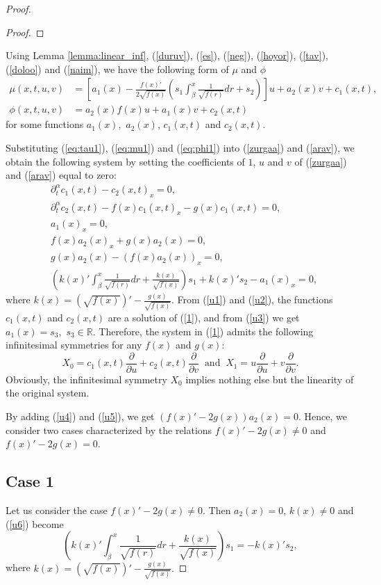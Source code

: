 \documentclass[12pt]{amsart}
\begin{document}
\begin{proof}
\begin{proof}
\end{proof}

Using Lemma \ref{lemma:linear_inf}, (\ref{duruv}), (\ref{es}), (\ref{neg}), (\ref{hoyor}), (\ref{tav}), (\ref{doloo}) and (\ref{naim}), we have the following form of $\mu$ and $\phi$
\begin{align}
\mu(x,t,u,v)&=\left[a_1(x)-\frac{f(x)'}{2\sqrt{f(x)}}\left( s_1\int^x_{\beta} \frac{1}{\sqrt{f(r)}}dr+s_2 \right)\right]u+a_2(x)v+c_1(x,t),\label{eq:mu1}\\
\phi(x,t,u,v)&=a_2(x)f(x)u+a_1(x)v+c_2(x,t)\label{eq:phi1}
\end{align}
for some functions $a_1(x),$ $a_2(x)$, $c_1(x,t)$ and $c_2(x,t)$.

Substituting (\ref{eq:tau1}), (\ref{eq:mu1}) and (\ref{eq:phi1}) into (\ref{zurgaa}) and  (\ref{arav}), we obtain the following system by setting the coefficients of $1$, $u$ and $v$ of (\ref{zurgaa}) and  (\ref{arav})  equal to zero:
\begin{align}
&\partial^\alpha_t c_1(x,t)-c_2(x,t)_x=0,\label{u1}\\
&\partial^\alpha_tc_2(x,t)-f(x)c_1(x,t)_x-g(x)c_1(x,t)=0,\label{u2}\\
&a_1(x)_x=0,\label{u3}\\
&f(x)a_2(x)_x+g(x)a_2(x)=0,\label{u4}\\
&g(x)a_2(x)-\left(f(x)a_2(x)\right)_x=0,\label{u5}\\
&\left(k(x)'\int^x_{\beta} \frac{1}{\sqrt{f(r)}}dr+\frac{k(x)}{\sqrt{f(x)}}\right)s_1+k(x)'s_2-a_1(x)_x=0,\label{u6}
\end{align}
where $k(x)=\left(\sqrt{f(x)}\right)'-\frac{g(x)}{\sqrt{f(x)}}.$ From (\ref{u1}) and (\ref{u2}), the functions $c_1(x,t)$ and $c_2(x,t)$ are a solution of (\ref{1}), and from (\ref{u3}) we get  $a_1(x)=s_3,$ $s_3\in \mathbb{R}$. Therefore, the system in (\ref{1}) admits the following infinitesimal symmetries for any $f(x)$ and $g(x)$:
$$
X_0=c_1(x,t)\frac{\partial}{\partial u}+c_2(x,t)\frac{\partial}{\partial v}~\text{ and }~X_1=u\frac{\partial}{\partial u}+v\frac{\partial}{\partial v}.
$$
Obviously, the infinitesimal symmetry $X_0$ implies nothing else but the linearity of the original system. 

By adding (\ref{u4}) and (\ref{u5}), we get $(f(x)'-2g(x))a_2(x)=0$. Hence, we consider two cases characterized by the relations $f(x)'-2g(x)\neq 0$ and $f(x)'-2g(x)=0$.

\subsection*{Case 1}
Let us consider the case $f(x)'-2g(x)\neq 0$. Then $a_2(x)=0$, $k(x)\neq0$ and (\ref{u6}) become 
\begin{equation}\label{eq:aravus1s2}
\left(k(x)'\int^x_{\beta} \frac{1}{\sqrt{f(r)}}dr+\frac{k(x)}{\sqrt{f(x)}}\right)s_1
=-k(x)'s_2,
\end{equation}
where $k(x)=\left(\sqrt{f(x)}\right)'-\frac{g(x)}{\sqrt{f(x)}}.$


\end{proof}
\end{document}

